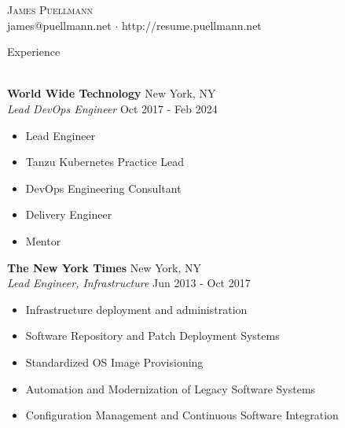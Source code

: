 \documentclass[letterpaper]{article}
\newcommand{\lineunder} {
    \vspace*{-8pt} \\
    \hspace*{-18pt} \hrulefill \\
}
\newcommand{\header} [1] {
    {\hspace*{-18pt}\vspace*{6pt} #1}
    \vspace*{-6pt} \lineunder
}
\begin{document}
\vspace*{-40pt}

    

\vspace*{-10pt}
\begin{center}
	{\Huge \scshape {James Puellmann}}\\
	james@puellmann.net $\cdot$ http://resume.puellmann.net\\
\end{center}

\header{Experience}
\vspace{1mm}

\textbf{World Wide Technology} \hfill New York, NY\\
\textit{Lead DevOps Engineer} \hfill Oct 2017 - Feb 2024\\
\vspace{-1mm}
\begin{itemize} \itemsep 1pt
	\item Lead Engineer
	\item Tanzu Kubernetes Practice Lead
	\item DevOps Engineering Consultant
	\item Delivery Engineer
	\item Mentor
\end{itemize}

\textbf{The New York Times} \hfill New York, NY\\
\textit{Lead Engineer, Infrastructure} \hfill Jun 2013 - Oct 2017\\
\vspace{-1mm}
\begin{itemize} \itemsep 1pt
	\item Infrastructure deployment and administration
	\item Software Repository and Patch Deployment Systems
	\item Standardized OS Image Provisioning
	\item Automation and Modernization of Legacy Software Systems
	\item Configuration Management and Continuous Software Integration
\end{itemize}
\end{document}
